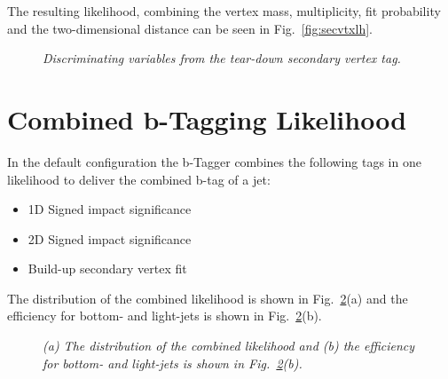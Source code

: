 \documentclass[a4paper,12pt]{article}
\begin{document}
The resulting likelihood, combining the vertex mass, multiplicity, 
fit probability and the two-dimensional distance can be seen in 
Fig.~\ref{fig:secvtxlh}.

\begin{figure}[htbp]
  \centerline
  {
  }
  \caption[]{\label{fig:TDvars}\sl
    Discriminating variables from the tear-down secondary vertex tag.  }
\end{figure}


\section{Combined b-Tagging Likelihood}
In the default configuration the b-Tagger combines the following 
tags in one likelihood to deliver the combined b-tag of a jet:
\begin{itemize}
\item 1D Signed impact significance
\item 2D Signed impact significance
\item Build-up secondary vertex fit
\end{itemize}
The distribution of the combined likelihood is shown in Fig.~\ref{fig:comblh}(a)
and the efficiency for bottom- and light-jets is shown in Fig.~\ref{fig:comblh}(b). 

\begin{figure}[htbp]
  \centerline
  {
  }
  \caption[]{\label{fig:comblh}\sl (a) The distribution of the
    combined likelihood and (b) the efficiency for bottom- and
    light-jets is shown in Fig.~\ref{fig:comblh}(b).}
\end{figure}




\end{document}
